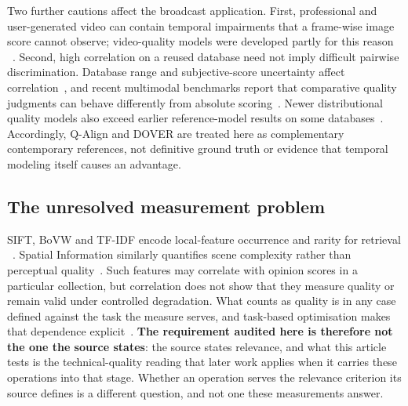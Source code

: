 Two further cautions affect the broadcast application. First, professional and
user-generated video can contain temporal impairments that a frame-wise image
score cannot observe; video-quality models were developed partly for this reason
~\citep{wang2021uvq,huang2023xgcvqa}. Second, high correlation on a reused
database need not imply difficult pairwise discrimination. Database range and
subjective-score uncertainty affect correlation~\citep{krasula2016methodology},
and recent multimodal benchmarks report that comparative quality judgments can
behave differently from absolute scoring~\citep{zhang2024qbenchplus}. Newer
distributional quality models also exceed earlier reference-model results on
some databases~\citep{you2025deqascore}. Accordingly, Q-Align and DOVER are
treated here as complementary contemporary references, not definitive ground
truth or evidence that temporal modeling itself causes an advantage.

\subsection{The unresolved measurement problem}

SIFT, BoVW and TF-IDF encode local-feature occurrence and rarity for retrieval
~\citep{lowe2004sift,sivic2003videogoogle,csurka2004bovw,
salton1988tfidf}. Spatial Information similarly quantifies scene complexity
rather than perceptual quality~\citep{itu_p910,robitza2021siti}. Such features
may correlate with opinion scores in a particular collection, but correlation
does not show that they measure quality or remain valid under controlled
degradation. What counts as quality is in any case defined against the task the measure
serves, and task-based optimisation makes that dependence
explicit~\citep{leszczuk2014taskbased}. \textbf{The requirement audited here is therefore
not the one the source states}: the source states relevance, and what this article tests is
the technical-quality reading that later work applies when it carries these operations into
that stage. Whether an operation serves the relevance criterion its source defines is a
different question, and not one these measurements answer.


